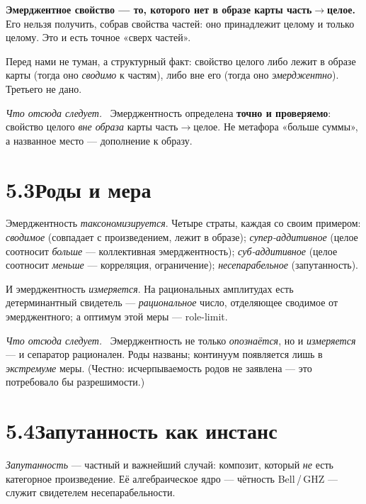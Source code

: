 \documentclass[12pt,a4paper]{article}
\newcommand{\rezultat}{\medskip\noindent\emph{Что отсюда следует.}\ }
\begin{document}
\textbf{Эмерджентное свойство --- то, которого нет в образе карты часть$\to$целое.} Его нельзя получить,
собрав свойства частей: оно принадлежит целому и только целому. Это и есть точное «сверх частей».

Перед нами не туман, а структурный факт: свойство целого либо лежит в образе карты (тогда оно
\emph{сводимо} к частям), либо вне его (тогда оно \emph{эмерджентно}). Третьего не дано.

\rezultat
Эмерджентность определена \textbf{точно и проверяемо}: свойство целого \emph{вне образа} карты
часть$\to$целое. Не метафора «больше суммы», а названное место --- дополнение к образу.

\section*{5.3\quad Роды и мера}

Эмерджентность \emph{таксономизируется}. Четыре страты, каждая со своим примером: \emph{сводимое}
(совпадает с произведением, лежит в образе); \emph{супер-аддитивное} (целое соотносит \emph{больше} ---
коллективная эмерджентность); \emph{суб-аддитивное} (целое соотносит \emph{меньше} --- корреляция,
ограничение); \emph{несепарабельное} (запутанность).

И эмерджентность \emph{измеряется}. На рациональных амплитудах есть детерминантный свидетель ---
\emph{рациональное} число, отделяющее сводимое от эмерджентного; а оптимум этой меры --- role-limit.

\rezultat
Эмерджентность не только \emph{опознаётся}, но и \emph{измеряется} --- и сепаратор рационален. Роды
названы; континуум появляется лишь в \emph{экстремуме} меры. (Честно: исчерпываемость родов не
заявлена --- это потребовало бы разрешимости.)

\section*{5.4\quad Запутанность как инстанс}

\emph{Запутанность} --- частный и важнейший случай: композит, который \emph{не} есть категорное
произведение. Её алгебраическое ядро --- чётность Bell\,/\,GHZ --- служит свидетелем несепарабельности.
\end{document}
